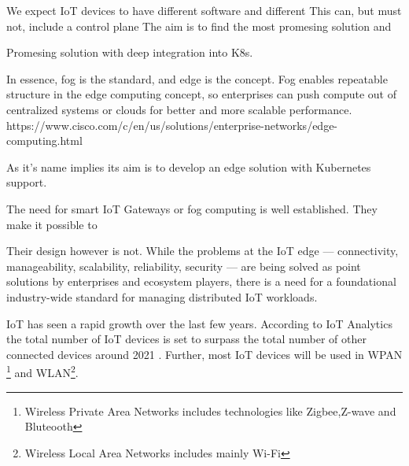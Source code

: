 {We expect IoT devices to have different software and different 
This can, but must not, include a control plane
The aim is to find the most promesing solution and 




Promesing solution with deep integration into K8s.


In essence, fog is the standard, and edge is the concept. Fog enables repeatable structure in the edge computing concept, so enterprises can push compute out of centralized systems or clouds for better and more scalable performance.
https://www.cisco.com/c/en/us/solutions/enterprise-networks/edge-computing.html


As it's name implies its aim is to develop an edge solution with Kubernetes support.

The need for smart IoT Gateways or fog computing is well established. They make it possible to 

Their design however is not. 
While the problems at the IoT edge — connectivity, manageability, scalability, reliability, security — are being solved as point solutions by enterprises and ecosystem players, there is a need for a foundational industry-wide standard for managing distributed IoT workloads.





IoT has seen a rapid growth over the last few years. According to IoT Analytics the total number of IoT devices is set to surpass the total number of other connected devices around 2021 \cite{StateofIoT:online}. Further, most IoT devices will be used in WPAN \footnote{Wireless Private Area Networks includes technologies like Zigbee,Z-wave and Bluteooth} and WLAN\footnote{Wireless Local Area Networks includes mainly Wi-Fi}. 


}
